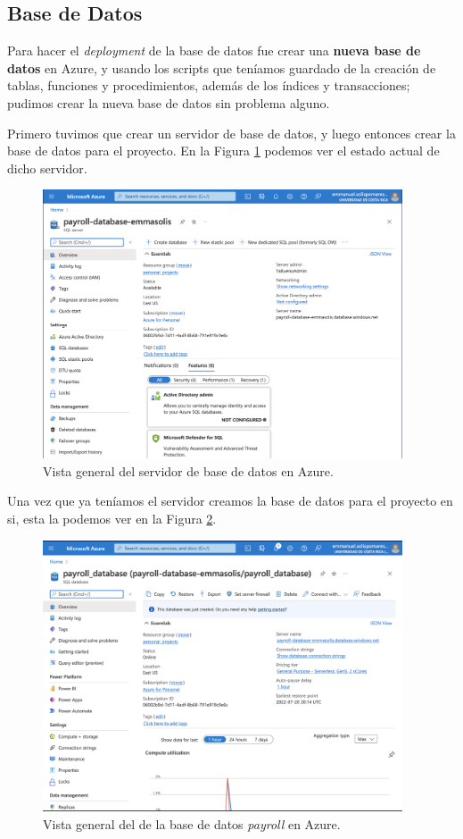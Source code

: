 \documentclass{article}
\begin{document}
\subsection{Base de Datos}
Para hacer el \textit{deployment} de la base de datos fue crear una \textbf{nueva base de datos}
en Azure, y usando los scripts que teníamos guardado de la creación de tablas, funciones
y procedimientos, además de los índices y transacciones; pudimos crear la nueva base de datos
sin problema alguno.

Primero tuvimos que crear un servidor de base de datos, y luego entonces crear la base
de datos para el proyecto. En la Figura \ref{fig:database_server} podemos ver el estado
actual de dicho servidor.

\begin{figure}[h]
 \centering
 \includegraphics[width=0.95\textwidth]{database_server.png}
 \caption{Vista general del servidor de base de datos en Azure.}
 \label{fig:database_server}
\end{figure}

Una vez que ya teníamos el servidor creamos la base de datos para el proyecto en si,
esta la podemos ver en la Figura \ref{fig:payroll_database}.

\begin{figure}[h]
  \centering
  \includegraphics[width=0.95\textwidth]{payroll_database.png}
  \caption{Vista general del de la base de datos \textit{payroll} en Azure.}
  \label{fig:payroll_database}
 \end{figure}
\end{document}
